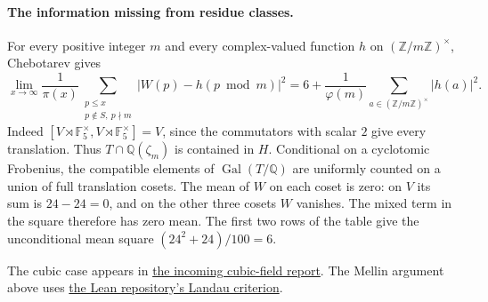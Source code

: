 \paragraph{The information missing from residue classes.}
For every positive integer $m$ and every complex-valued function $h$
on $(\mathbb Z/m\mathbb Z)^\times$, Chebotarev gives
\[
 \lim_{x\to\infty}\frac1{\pi(x)}
 \sum_{\substack{p\le x\\p\notin S,\ p\nmid m}}
       |W(p)-h(p\bmod m)|^2
  =6+\frac1{\varphi(m)}
           \sum_{a\in(\mathbb Z/m\mathbb Z)^\times}|h(a)|^2 .
\]
Indeed $[V\rtimes\mathbb F_5^\times,V\rtimes\mathbb F_5^\times]=V$,
since the commutators with scalar $2$ give every translation. Thus
$T\cap\mathbb Q(\zeta_m)$ is contained in $H$. Conditional on a
cyclotomic Frobenius, the compatible elements of $\operatorname{Gal}(T/\mathbb Q)$
are uniformly counted on a union of full translation cosets. The mean
of $W$ on each coset is zero: on $V$ its sum is $24-24=0$, and on
the other three cosets $W$ vanishes. The mixed term in the square
therefore has zero mean. The first two rows of the table give the
unconditional mean square $(24^2+24)/100=6$.

The cubic case appears in
\href{https://github.com/VladimirReshetnikov/ProveIt/tree/1e1728ad221d69e48fea09bf754b73422af44943/docs/incoming}
{the incoming cubic-field report}. The Mellin argument above uses
\href{https://github.com/lsernau/grh-lean/blob/72fead102f663d5c7a407964a13dc0cf9d977207/grh-compact/src/New/Endgame/OneSidedCriterion.lean}
{the Lean repository's Landau criterion}.
